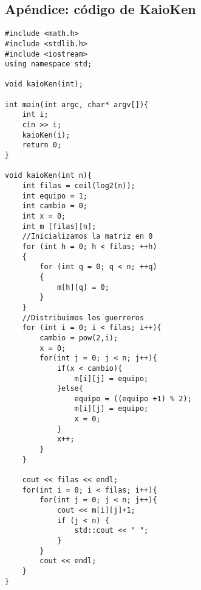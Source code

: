 \documentclass[10pt,a4paper]{article}
\begin{document}






\newpage

\subsection{Apéndice: código de KaioKen}
\begin{lstlisting}
#include <math.h>
#include <stdlib.h>
#include <iostream>
using namespace std;

void kaioKen(int);

int main(int argc, char* argv[]){
	int i;
	cin >> i;
	kaioKen(i);
	return 0;
}

void kaioKen(int n){
	int filas = ceil(log2(n));
	int equipo = 1;
	int cambio = 0;
	int x = 0;
	int m [filas][n];
	//Inicializamos la matriz en 0
	for (int h = 0; h < filas; ++h)
	{
		for (int q = 0; q < n; ++q)
		{
			m[h][q] = 0;
		}
	}
	//Distribuimos los guerreros
	for (int i = 0; i < filas; i++){
		cambio = pow(2,i);
		x = 0;
		for(int j = 0; j < n; j++){
			if(x < cambio){
				m[i][j] = equipo;
			}else{
				equipo = ((equipo +1) % 2);
				m[i][j] = equipo;
				x = 0;
			}
			x++;
		}
	}

	cout << filas << endl;
	for(int i = 0; i < filas; i++){
		for(int j = 0; j < n; j++){
			cout << m[i][j]+1;
			if (j < n) {
				std::cout << " ";
			}
		}
		cout << endl;
	}
}
\end{lstlisting}
\end{document}
